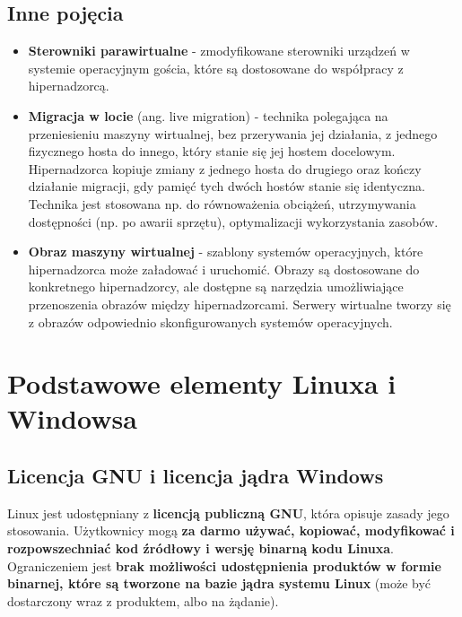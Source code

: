 \documentclass{article}
\begin{document}
\subsection{Inne pojęcia}
\begin{itemize}
    \item \textbf{Sterowniki parawirtualne} - zmodyfikowane sterowniki urządzeń w systemie operacyjnym gościa, które są dostosowane do współpracy z hipernadzorcą.
    \item \textbf{Migracja w locie} (ang. live migration) - technika polegająca na przeniesieniu maszyny wirtualnej, bez przerywania jej działania, z jednego fizycznego hosta do innego, który stanie się jej hostem docelowym. Hipernadzorca kopiuje zmiany z jednego hosta do drugiego oraz kończy działanie migracji, gdy pamięć tych dwóch hostów stanie się identyczna. Technika jest stosowana np. do równoważenia obciążeń, utrzymywania dostępności (np. po awarii sprzętu), optymalizacji wykorzystania zasobów.
    \item \textbf{Obraz maszyny wirtualnej} - szablony systemów operacyjnych, które hipernadzorca może załadować i uruchomić. Obrazy są dostosowane do konkretnego hipernadzorcy, ale dostępne są narzędzia umożliwiające przenoszenia obrazów między hipernadzorcami. Serwery wirtualne tworzy się z obrazów odpowiednio skonfigurowanych systemów operacyjnych.
\end{itemize}

\section{Podstawowe elementy Linuxa i Windowsa}

\subsection{Licencja GNU i licencja jądra Windows}
Linux jest udostępniany z \textbf{licencją publiczną GNU}, która opisuje zasady jego stosowania. Użytkownicy mogą \textbf{za darmo używać, kopiować, modyfikować i rozpowszechniać kod źródłowy i wersję binarną kodu Linuxa}. Ograniczeniem jest \textbf{brak możliwości udostępnienia produktów w formie binarnej, które są tworzone na bazie jądra systemu Linux} (może być dostarczony wraz z produktem, albo na żądanie).
\end{document}
